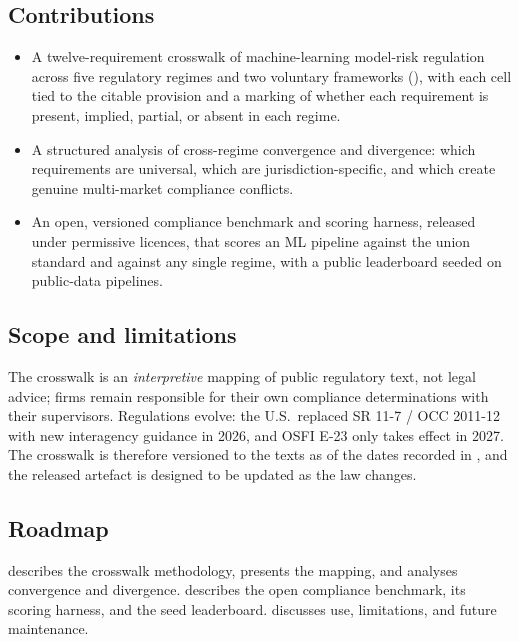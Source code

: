 \subsection{Contributions}\label{sec:contributions}

\begin{itemize}[leftmargin=*]
    \item A twelve-requirement crosswalk of machine-learning model-risk regulation across five regulatory regimes and two voluntary frameworks (), with each cell tied to the citable provision and a marking of whether each requirement is present, implied, partial, or absent in each regime.
    \item A structured analysis of cross-regime convergence and divergence: which requirements are universal, which are jurisdiction-specific, and which create genuine multi-market compliance conflicts.
    \item An open, versioned compliance benchmark and scoring harness, released under permissive licences, that scores an ML pipeline against the union standard and against any single regime, with a public leaderboard seeded on public-data pipelines.
\end{itemize}

\subsection{Scope and limitations}\label{sec:scope}

The crosswalk is an \emph{interpretive} mapping of public regulatory text, not legal advice; firms remain responsible for their own compliance determinations with their supervisors. Regulations evolve: the U.S.\ replaced SR 11-7 / OCC 2011-12 with new interagency guidance in 2026, and OSFI E-23 only takes effect in 2027. The crosswalk is therefore versioned to the texts as of the dates recorded in , and the released artefact is designed to be updated as the law changes.

\subsection{Roadmap}\label{sec:roadmap}

 describes the crosswalk methodology, presents the mapping, and analyses convergence and divergence.  describes the open compliance benchmark, its scoring harness, and the seed leaderboard.  discusses use, limitations, and future maintenance.
